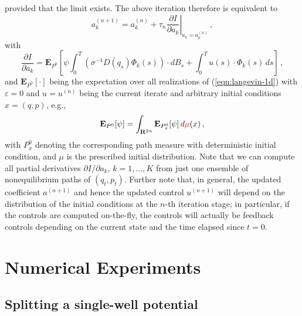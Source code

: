 \documentclass[]{tMPH2e}
\newcommand{\recheck}[1]{{\color{red} #1}}
\newcommand{\redc}[1]{{\color{red} #1}}
\newcommand{\R}{{\mathbf R}}
\newcommand{\eps}{\varepsilon}
\newcommand{\bE}{{\mathbf E}}
\begin{document}
provided that the limit exists. The above iteration therefore is equivalent to
\begin{equation}\label{gd}
a_{k}^{(n+1)} = a_{k}^{(n)} + \tau_{n}\left.\frac{\partial I}{\partial a_{k}}\right|_{a_{k}=a_{k}^{(n)}}\,,
\end{equation}
with
\begin{equation}\label{dida}
\frac{\partial I}{\partial a_{k}} = \bE_{P^0}\left[\psi\int_{0}^{T}(\sigma^{-1}D(q_{s})\Phi_{k}(s))\cdot dB_{s} + \int_{0}^{T}u(s)\cdot\Phi_{k}(s)\,ds \right] \,,
\end{equation}
and $\bE_{P^0}[\cdot]$ being the expectation over all realizations of (\ref{eqn:langevin-1d}) with $\eps=0$ and $u=u^{(n)}$ being the current iterate and arbitrary initial conditions $x=(q,p)$, e.g., 
\[
\bE_{P^{0}}[\psi] = \int_{\R^{2n}}\bE_{P^{0}_{x}}[\psi]\,d\recheck{\mu}(x) \,,
\]
with $P_{x}^{0}$ denoting the corresponding path measure with deterministic initial condition,
\redc{and $\mu$ is the prescribed initial distribution.}
Note that we can compute all partial derivatives $\partial I/\partial a_k$, $k=1,\ldots,K$ from just one ensemble of nonequilibrium paths of $(q_{t},p_{t})$. Further note that, in general, the updated coefficient $a^{(n+1)}$ and hence the updated control $u^{(n+1)}$ will depend on the distribution of the initial conditions at the $n$-th iteration stage; in particular, if the controls are computed on-the-fly, the controls will actually be feedback controls depending on the current state and the time elapsed since $t=0$.    





\section{Numerical Experiments}

\subsection{Splitting a single-well potential}
\end{document}

